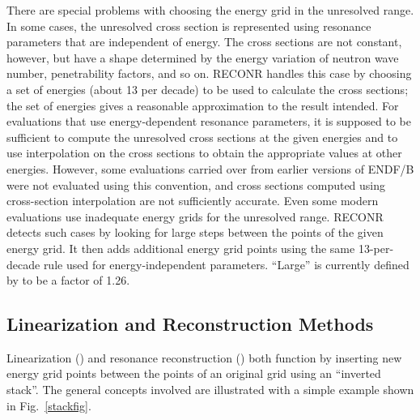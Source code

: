 There are special problems with choosing the energy grid in the
unresolved range.  In some cases,
the unresolved cross section is represented using resonance
parameters that are independent of energy.  The cross sections
are not constant, however, but have a shape determined by the
energy variation of neutron wave number, penetrability factors,
and so on.  RECONR handles this case by choosing a set of energies
(about 13 per decade) to be used to calculate the cross sections;
the set of energies gives a reasonable approximation to the result
intended.  For evaluations that use energy-dependent resonance
parameters, it is supposed to be sufficient to compute the
unresolved cross sections at the given energies and to use
interpolation on the cross sections to obtain
the appropriate values at other energies.  However, some
evaluations carried over from earlier versions of ENDF/B were not
evaluated using this convention, and cross sections computed
using cross-section interpolation are not sufficiently accurate.
Even some modern evaluations use inadequate energy grids for
the unresolved range.  RECONR detects such cases by looking for
large steps between the points of the given energy grid.  It
then adds additional energy grid points using the same
13-per-decade rule used for energy-independent parameters.
``Large'' is currently defined by  to be a factor
of 1.26.

\subsection{Linearization and Reconstruction Methods}
\label{ssRECONR_linear}

Linearization () and resonance
reconstruction ()
both function by inserting new energy grid points between
the points of an original grid using an ``inverted
stack''.  The general concepts involved
are illustrated with a simple example shown in Fig.~\ref{stackfig}.

